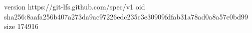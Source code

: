 version https://git-lfs.github.com/spec/v1
oid sha256:8aafa256b407a273da9ac97226edc235c3e30909fdfab31a78ad0a8a57c0bd99
size 174916
